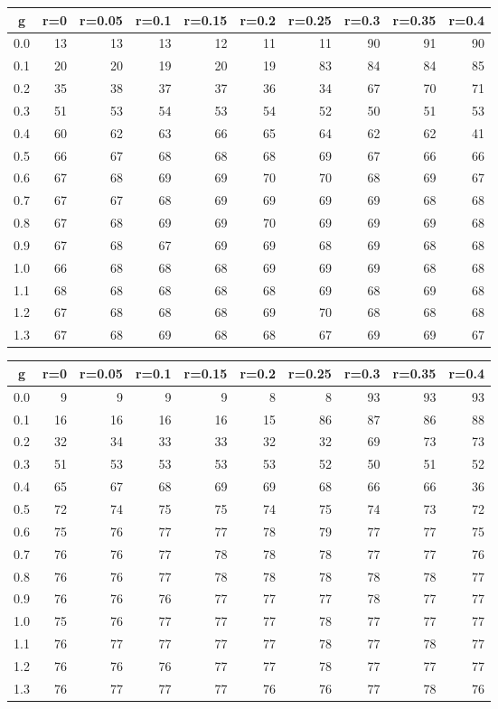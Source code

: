 %
\begin{table}[!tbp]
 \begin{center}
 \begin{tabular}{rrrrrrrrrr}\hline\hline
\multicolumn{1}{c}{g}&\multicolumn{1}{c}{r=0}&\multicolumn{1}{c}{r=0.05}&\multicolumn{1}{c}{r=0.1}&\multicolumn{1}{c}{r=0.15}&\multicolumn{1}{c}{r=0.2}&\multicolumn{1}{c}{r=0.25}&\multicolumn{1}{c}{r=0.3}&\multicolumn{1}{c}{r=0.35}&\multicolumn{1}{c}{r=0.4}\tabularnewline
\hline
0.0&13&13&13&12&11&11&90&91&90\tabularnewline
0.1&20&20&19&20&19&83&84&84&85\tabularnewline
0.2&35&38&37&37&36&34&67&70&71\tabularnewline
0.3&51&53&54&53&54&52&50&51&53\tabularnewline
0.4&60&62&63&66&65&64&62&62&41\tabularnewline
0.5&66&67&68&68&68&69&67&66&66\tabularnewline
0.6&67&68&69&69&70&70&68&69&67\tabularnewline
0.7&67&67&68&69&69&69&69&68&68\tabularnewline
0.8&67&68&69&69&70&69&69&69&68\tabularnewline
0.9&67&68&67&69&69&68&69&68&68\tabularnewline
1.0&66&68&68&68&69&69&69&68&68\tabularnewline
1.1&68&68&68&68&68&69&68&69&68\tabularnewline
1.2&67&68&68&68&69&70&68&68&68\tabularnewline
1.3&67&68&69&68&68&67&69&69&67\tabularnewline
\hline
\end{tabular}

\end{center}

\end{table}

%
\begin{table}[!tbp]
 \begin{center}
 \begin{tabular}{rrrrrrrrrr}\hline\hline
\multicolumn{1}{c}{g}&\multicolumn{1}{c}{r=0}&\multicolumn{1}{c}{r=0.05}&\multicolumn{1}{c}{r=0.1}&\multicolumn{1}{c}{r=0.15}&\multicolumn{1}{c}{r=0.2}&\multicolumn{1}{c}{r=0.25}&\multicolumn{1}{c}{r=0.3}&\multicolumn{1}{c}{r=0.35}&\multicolumn{1}{c}{r=0.4}\tabularnewline
\hline
0.0& 9& 9& 9& 9& 8& 8&93&93&93\tabularnewline
0.1&16&16&16&16&15&86&87&86&88\tabularnewline
0.2&32&34&33&33&32&32&69&73&73\tabularnewline
0.3&51&53&53&53&53&52&50&51&52\tabularnewline
0.4&65&67&68&69&69&68&66&66&36\tabularnewline
0.5&72&74&75&75&74&75&74&73&72\tabularnewline
0.6&75&76&77&77&78&79&77&77&75\tabularnewline
0.7&76&76&77&78&78&78&77&77&76\tabularnewline
0.8&76&76&77&78&78&78&78&78&77\tabularnewline
0.9&76&76&76&77&77&77&78&77&77\tabularnewline
1.0&75&76&77&77&77&78&77&77&77\tabularnewline
1.1&76&77&77&77&77&78&77&78&77\tabularnewline
1.2&76&76&76&77&77&78&77&77&77\tabularnewline
1.3&76&77&77&77&76&76&77&78&76\tabularnewline
\hline
\end{tabular}

\end{center}

\end{table}

